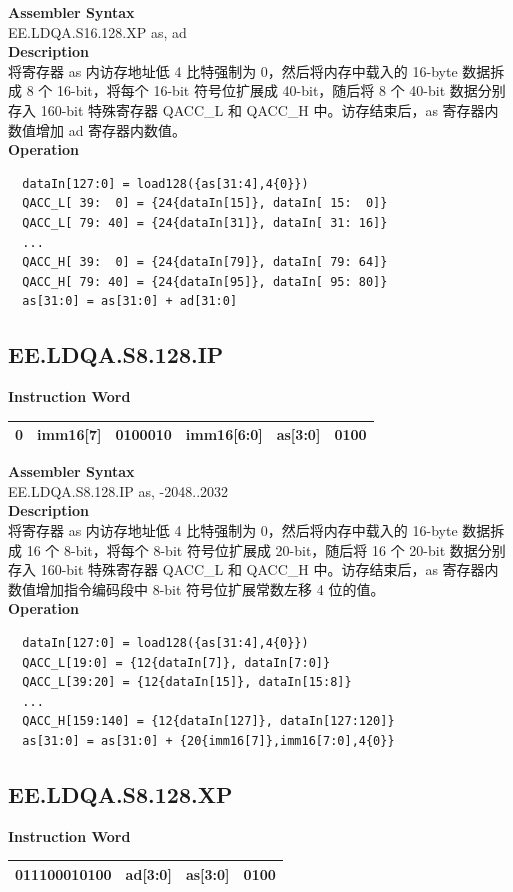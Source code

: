 \textbf{Assembler Syntax} \\
EE.LDQA.S16.128.XP as, ad \\
\textbf{Description} \\
将寄存器 as 内访存地址低 4 比特强制为 0，然后将内存中载入的 16-byte 数据拆成 8 个 16-bit，将每个 16-bit 符号位扩展成 40-bit，随后将 8 个 40-bit 数据分别存入 160-bit 特殊寄存器 QACC\_L 和 QACC\_H 中。访存结束后，as 寄存器内数值增加 ad 寄存器内数值。\\
\textbf{Operation}
\begin{lstlisting}
  dataIn[127:0] = load128({as[31:4],4{0}})
  QACC_L[ 39:  0] = {24{dataIn[15]}, dataIn[ 15:  0]}
  QACC_L[ 79: 40] = {24{dataIn[31]}, dataIn[ 31: 16]}
  ...
  QACC_H[ 39:  0] = {24{dataIn[79]}, dataIn[ 79: 64]}
  QACC_H[ 79: 40] = {24{dataIn[95]}, dataIn[ 95: 80]}
  as[31:0] = as[31:0] + ad[31:0]
\end{lstlisting}

\clearpage
\subsection{EE.LDQA.S8.128.IP}\label{instruction:EELDQAS8128IP}
\setlength\tabcolsep{6pt}
\textbf{Instruction Word} \\
\begin{tabular}{|c|c|c|c|c|c|}
	\hline
	0 & imm16[7] & 0100010 & imm16[6:0] & as[3:0] & 0100 \\
	\hline
\end{tabular}

\textbf{Assembler Syntax} \\
EE.LDQA.S8.128.IP as, -2048..2032 \\
\textbf{Description} \\
将寄存器 as 内访存地址低 4 比特强制为 0，然后将内存中载入的 16-byte 数据拆成 16 个 8-bit，将每个 8-bit 符号位扩展成 20-bit，随后将 16 个 20-bit 数据分别存入 160-bit 特殊寄存器 QACC\_L 和 QACC\_H 中。访存结束后，as 寄存器内数值增加指令编码段中 8-bit 符号位扩展常数左移 4 位的值。\\
\textbf{Operation}
\begin{lstlisting}
  dataIn[127:0] = load128({as[31:4],4{0}})
  QACC_L[19:0] = {12{dataIn[7]}, dataIn[7:0]}
  QACC_L[39:20] = {12{dataIn[15]}, dataIn[15:8]}
  ...
  QACC_H[159:140] = {12{dataIn[127]}, dataIn[127:120]}
  as[31:0] = as[31:0] + {20{imm16[7]},imm16[7:0],4{0}}
\end{lstlisting}

\clearpage
\subsection{EE.LDQA.S8.128.XP}\label{instruction:EELDQAS8128XP}
\setlength\tabcolsep{6pt}
\textbf{Instruction Word} \\
\begin{tabular}{|c|c|c|c|}
	\hline
	011100010100 & ad[3:0] & as[3:0] & 0100 \\
	\hline
\end{tabular}

